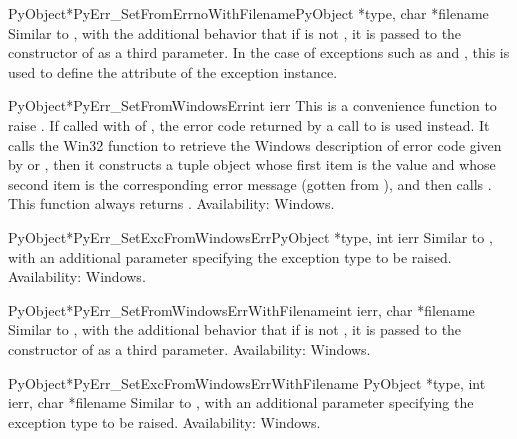 \begin{cfuncdesc}{PyObject*}{PyErr_SetFromErrnoWithFilename}{PyObject *type,
                                                             char *filename}
  Similar to , with the additional
  behavior that if  is not \NULL, it is passed to the
  constructor of  as a third parameter.  In the case of
  exceptions such as  and , this
  is used to define the  attribute of the exception
  instance.
\end{cfuncdesc}

\begin{cfuncdesc}{PyObject*}{PyErr_SetFromWindowsErr}{int ierr}
  This is a convenience function to raise .
  If called with  of , the error code returned by a
  call to  is used instead.  It calls the
  Win32 function  to retrieve the Windows
  description of error code given by  or
  , then it constructs a tuple object whose
  first item is the  value and whose second item is the
  corresponding error message (gotten from
  ), and then calls
  .
  This function always returns \NULL.
  Availability: Windows.
\end{cfuncdesc}

\begin{cfuncdesc}{PyObject*}{PyErr_SetExcFromWindowsErr}{PyObject *type,
	                                                 int ierr}
  Similar to , with an additional
  parameter specifying the exception type to be raised.
  Availability: Windows.
\end{cfuncdesc}

\begin{cfuncdesc}{PyObject*}{PyErr_SetFromWindowsErrWithFilename}{int ierr,
                                                                char *filename}
  Similar to , with the
  additional behavior that if  is not \NULL, it is
  passed to the constructor of  as a third
  parameter.
  Availability: Windows.
\end{cfuncdesc}

\begin{cfuncdesc}{PyObject*}{PyErr_SetExcFromWindowsErrWithFilename}
	{PyObject *type, int ierr, char *filename}
  Similar to , with
  an additional parameter specifying the exception type to be raised.
  Availability: Windows.
\end{cfuncdesc}

